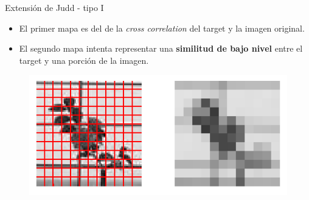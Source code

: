 \documentclass[compress]{beamer}
\begin{document}
\begin{frame}{Extensión de Judd - tipo I}

\begin{itemize}
\item El primer mapa es del de la \textit{cross correlation} del target y la imagen original.
\item El segundo mapa intenta representar una \textbf{similitud de bajo nivel} entre el target y una porción de la imagen.
\end{itemize}

\begin{figure}
\includegraphics[width=0.7\linewidth]{images/grilla-gorda.png} 
\end{figure}

\end{frame}
\end{document}
